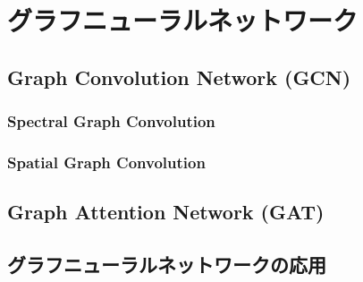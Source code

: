 \section{グラフニューラルネットワーク}
\subsection{Graph Convolution Network (GCN)}
\subsubsection{Spectral Graph Convolution}
\subsubsection{Spatial Graph Convolution}
\subsection{Graph Attention Network (GAT)}
\subsection{グラフニューラルネットワークの応用}